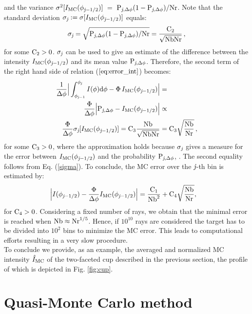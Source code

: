 and the variance $\sigma^2[I_{\textrm{MC}}(\phi_{\textit{j}-1/2})] ~=~ \textrm{P}_{\textit{j}, \Delta\phi}(1-\textrm{P}_{\textit{j}, \Delta\phi})/\textrm{Nr}$.
Note that the standard deviation $\sigma_{\textit{j}}:=\sigma[I_{\textrm{MC}}(\phi_{\textit{j}-1/2})]$ equals:
\begin{equation}\label{sigma}
\sigma_{\textit{j}}= \sqrt{\textrm{P}_{\textit{j}, \Delta\phi}(1-\textrm{P}_{\textit{j}, \Delta\phi})/\textrm{Nr}}= \frac{\textrm{C}_2}{\sqrt{\textrm{Nb}\textrm{Nr}}}\,, \end{equation}
 for some $\textrm{C}_{2}>0$. $\sigma_{\textit{j}}$ can be used to give an estimate of the difference between the intensity $I_{\textrm{MC}}(\phi_{\textit{j}-1/2})$ and its mean value $\textrm{P}_{\textit{j}, \Delta\phi}$.
Therefore, the second term of the right hand side of relation ($\ref{eq:error_int}$) becomes:
\begin{equation}\begin{aligned}
\frac{1}{\Delta \phi}\Big|\int_{\phi_{\textit{j}-1}}^{\phi_{\textit{j}}} I(\phi)\textrm{d}\phi -
\Phi\, I_{\textrm{MC}}(\phi_{\textit{j}-1/2})\Big| &=  \\
\frac{\Phi}{\Delta \phi}\Big|\textrm{P}_{\textit{j}, \Delta\phi} -I_{\textrm{MC}}(\phi_{\textit{j}-1/2})\Big| &\propto  \\
  \frac{\Phi}{\Delta \phi}
\sigma_{\textit{j}}[I_{\textrm{MC}}(\phi_{\textit{j}-1/2})]=\textrm{C}_3\frac{\textrm{Nb}}{\sqrt{\textrm{Nb}\textrm{Nr}}} & = \textrm{C}_3\sqrt{\frac{\textrm{Nb}}{\textrm{Nr}}}\,,
\end{aligned}
\end{equation}
for some $\textrm{C}_3>0$, where the approximation holds because $\sigma_{\textit{j}}$ gives a measure for the error between 
$I_{\textrm{MC}}(\phi_{\textit{j}-1/2})$ and the probability $\textrm{P}_{\textit{j}, \Delta\phi}$, \cite{Diez}. The second equality follows from Eq. (\ref{sigma}). To conclude, the MC error over the $\textit{j}$-th bin is estimated by:
\begin{equation} \begin{aligned}
\Big|I(\phi_{\textit{j}-1/2})&-\frac{\Phi}
{\Delta\phi}I_{\textrm{MC}}(\phi_{\textit{j}-1/2})\Big| =
\frac{\textrm{C}_1}{\textrm{Nb}^2} + \textrm{C}_4\sqrt{\frac{\textrm{Nb}}{\textrm{Nr}}},
\end{aligned}
\end{equation}
for $\textrm{C}_4>0$.
Considering a fixed number of rays, we obtain that the minimal error is reached when $\textrm{Nb}\approx \textrm{Nr}^{1/5}$.
Hence, if $10^{10}$ rays are considered the target has to be divided into $10^2$ bins to minimize the MC error.
This leads to computational efforts resulting in a very slow procedure.\\ \indent
To conclude we provide, as an example, the averaged and normalized MC intensity $\hat{I}_{\textrm{MC}}$ of the two-faceted cup described in the previous section, the profile of which is depicted in Fig. \ref{fig:cup}.

\section{Quasi-Monte Carlo method}
